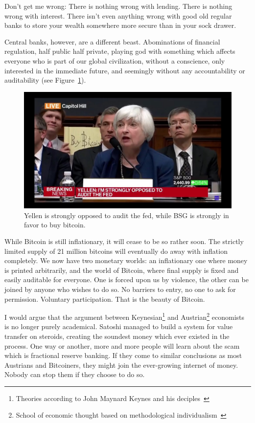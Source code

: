 Don't get me wrong: There is nothing wrong with lending. There is
nothing wrong with interest. There isn't even anything wrong with good
old regular banks to store your wealth somewhere more secure than in
your sock drawer.

Central banks, however, are a different beast. Abominations of financial
regulation, half public half private, playing god with something which
affects everyone who is part of our global civilization, without a
conscience, only interested in the immediate future, and seemingly
without any accountability or auditability (see Figure~\ref{fig:bsg}).

\begin{figure}
  \centering
  \includegraphics{assets/images/bsg.jpg}
  \caption{Yellen is strongly opposed to audit the fed, while BSG is strongly in favor to buy bitcoin.}
  \label{fig:bsg}
\end{figure}

While Bitcoin is still inflationary, it will cease to be so rather soon.
The strictly limited supply of 21 million bitcoins will eventually do
away with inflation completely. We now have two monetary worlds: an
inflationary one where money is printed arbitrarily, and the world of
Bitcoin, where final supply is fixed and easily auditable for everyone.
One is forced upon us by violence, the other can be joined by anyone who
wishes to do so. No barriers to entry, no one to ask for permission.
Voluntary participation. That is the beauty of Bitcoin.

I would argue that the argument between Keynesian\footnote{Theories according to
John Maynard Keynes and his deciples~\cite{wiki:keynesian}} and
Austrian\footnote{School of economic thought based on methodological
individualism~\cite{wiki:austrian}} economists is no longer purely academical.
Satoshi managed to build a system for value transfer on steroids, creating the
soundest money which ever existed in the process. One way or another, more and
more people will learn about the scam which is fractional reserve banking. If
they come to similar conclusions as most Austrians and Bitcoiners, they might
join the ever-growing internet of money. Nobody can stop them if they choose to
do so.

